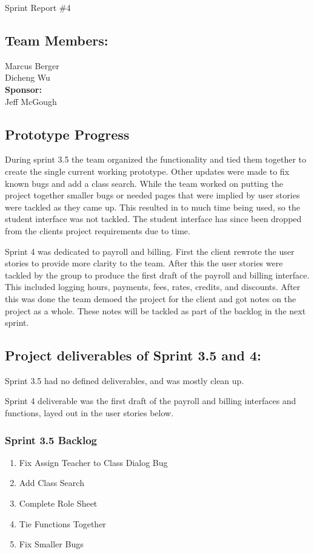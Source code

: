 Sprint Report \#4


\subsection{Team Members:}
Marcus Berger
\\Dicheng Wu\\
\textbf{Sponsor:}
\\Jeff McGough
\\

\subsection{Prototype Progress}
During sprint 3.5 the team organized the functionality and tied them together to create the single current working prototype. Other updates were made to fix known bugs and add a class search. While the team worked on putting the project together smaller bugs or needed pages that were implied by user stories were tackled as they came up. This resulted in to much time being used, so the student interface was not tackled. The student interface has since been dropped from the clients project requirements due to time.

Sprint 4 was dedicated to payroll and billing. First the client rewrote the user stories to provide more clarity to the team. After this the user stories were tackled by the group to produce the first draft of the payroll and billing interface. This included logging hours, payments, fees, rates, credits, and discounts. After this was done the team demoed the project for the client and got notes on the project as a whole. These notes will be tackled as part of the backlog in the next sprint.


\subsection{Project deliverables of Sprint 3.5 and 4:}
Sprint 3.5 had no defined deliverables, and was mostly clean up.

Sprint 4 deliverable was the first draft of the payroll and billing interfaces and functions, layed out in the user stories below.



\subsubsection{Sprint 3.5 Backlog}

\begin{enumerate}
\item Fix Assign Teacher to Class Dialog Bug
\item Add Class Search
\item Complete Role Sheet
\item Tie Functions Together
\item Fix Smaller Bugs
\end{enumerate}

